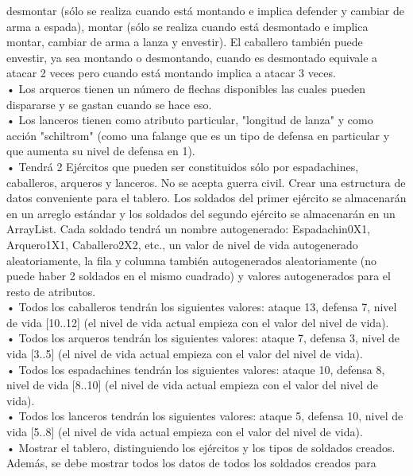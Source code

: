 \documentclass{article}
\begin{document}
\begin{itemize}
	      desmontar (sólo se realiza cuando está montando e implica defender y cambiar
	      de arma a espada), montar (sólo se realiza cuando está desmontado e implica
	      montar, cambiar de arma a lanza y envestir). El caballero también puede
	      envestir, ya sea montando o desmontando, cuando es desmontado equivale a
	      atacar 2 veces pero cuando está montando implica a atacar 3 veces.
	      \\• Los arqueros tienen un número de flechas disponibles las cuales pueden
	      dispararse y se gastan cuando se hace eso.
	      \\• Los lanceros tienen como atributo particular, "longitud de lanza" y como acción
	      "schiltrom" (como una falange que es un tipo de defensa en particular y que
	      aumenta su nivel de defensa en 1).
	      \\• Tendrá 2 Ejércitos que pueden ser constituidos sólo por espadachines,
	      caballeros, arqueros y lanceros. No se acepta guerra civil. Crear una estructura
	      de datos conveniente para el tablero. Los soldados del primer ejército se
	      almacenarán en un arreglo estándar y los soldados del segundo ejército se
	      almacenarán en un ArrayList. Cada soldado tendrá un nombre autogenerado:
	      Espadachin0X1, Arquero1X1, Caballero2X2, etc., un valor de nivel de vida
	      autogenerado aleatoriamente, la fila y columna también autogenerados
	      aleatoriamente (no puede haber 2 soldados en el mismo cuadrado) y valores
	      autogenerados para el resto de atributos.
	      \\• Todos los caballeros tendrán los siguientes valores: ataque 13, defensa 7, nivel
	      de vida [10..12] (el nivel de vida actual empieza con el valor del nivel de vida).
	      \\• Todos los arqueros tendrán los siguientes valores: ataque 7, defensa 3, nivel
	      de vida [3..5] (el nivel de vida actual empieza con el valor del nivel de vida).
	      \\• Todos los espadachines tendrán los siguientes valores: ataque 10, defensa 8,
	      nivel de vida [8..10] (el nivel de vida actual empieza con el valor del nivel de
	      vida).
	      \\• Todos los lanceros tendrán los siguientes valores: ataque 5, defensa 10, nivel
	      de vida [5..8] (el nivel de vida actual empieza con el valor del nivel de vida).
	      \\• Mostrar el tablero, distinguiendo los ejércitos y los tipos de soldados creados.
	      Además, se debe mostrar todos los datos de todos los soldados creados para

\end{itemize}
\end{document}
